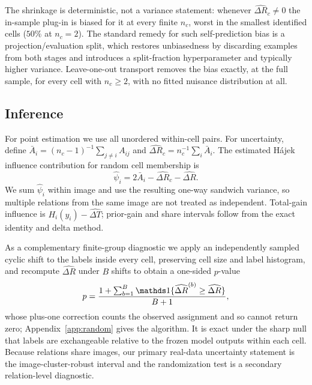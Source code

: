 The shrinkage is deterministic, not a variance statement: whenever
$\widehat{\Delta R}_c\neq0$ the in-sample plug-in is biased for it at every finite $n_c$,
worst in the smallest identified cells ($50\%$ at $n_c=2$). The standard remedy for such
self-prediction bias is a projection/evaluation split, which restores unbiasedness by
discarding examples from both stages and introduces a split-fraction hyperparameter and
typically higher variance. Leave-one-out transport removes the bias exactly, at the full
sample, for every cell with $n_c\ge2$, with no fitted nuisance distribution at all.

\subsection{Inference}\label{sec:inference}

For point estimation we use all unordered within-cell pairs. For uncertainty, define
$\bar A_i=(n_c-1)^{-1}\sum_{j\ne i}A_{ij}$ and
$\widehat{\Delta R}_c=n_c^{-1}\sum_i\bar A_i$. The estimated H\'ajek influence
contribution for random cell membership is
\begin{equation}
\widehat\psi_i=2\bar A_i-\widehat{\Delta R}_c-\widehat{\Delta R}.
\label{eq:influence}
\end{equation}
We sum $\widehat\psi_i$ within image and use the resulting one-way sandwich variance,
so multiple relations from the same image are not treated as independent. Total-gain
influence is $H_i(y_i)-\widehat{\Delta T}$; prior-gain and share intervals follow from
the exact identity and delta method.

As a complementary finite-group diagnostic we apply an independently sampled cyclic shift to
the labels inside every cell, preserving cell size and label histogram, and recompute
$\widehat{\Delta R}$ under $B$ shifts to obtain a one-sided $p$-value
\begin{equation}
p=\frac{1+\sum_{b=1}^B\ind\{\widehat{\Delta R}^{(b)}\ge\widehat{\Delta R}\}}{B+1},
\label{eq:randp}
\end{equation}
whose plus-one correction counts the observed assignment and so cannot return zero;
Appendix~\ref{app:random} gives the algorithm. It is exact under the sharp null that labels are exchangeable
relative to the frozen model outputs within each cell. Because relations share images, our
primary real-data uncertainty statement is the image-cluster-robust interval and the
randomization test is a secondary relation-level diagnostic.

